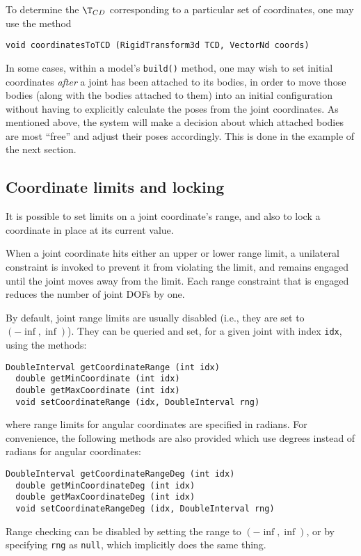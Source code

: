 To determine the $\T_{CD}$ corresponding to a particular set of
coordinates, one may use the method
\begin{lstlisting}[]
  void coordinatesToTCD (RigidTransform3d TCD, VectorNd coords)
\end{lstlisting}
%

In some cases, within a model's {\tt build()} method, one may wish to
set initial coordinates {\it after} a joint has been attached to its
bodies, in order to move those bodies (along with the bodies attached
to them) into an initial configuration without having to explicitly
calculate the poses from the joint coordinates. As mentioned
above, the system will make a decision about which attached bodies are
most ``free'' and adjust their poses accordingly. This is done in the
example of the next section.

\subsection{Coordinate limits and locking}
\label{coordinateLimitsAndLocking:sec}

It is possible to set limits on a joint coordinate's range, and also
to lock a coordinate in place at its current value.

When a joint coordinate hits either an upper or lower range limit, a
unilateral constraint is invoked to prevent it from violating the
limit, and remains engaged until the joint moves away from the
limit. Each range constraint that is engaged reduces the number of
joint DOFs by one.

By default, joint range limits are usually disabled (i.e., they are
set to $(-\inf, \inf)$). They can be queried and set, for a given
joint with index {\tt idx}, using the methods:
\begin{lstlisting}[]
  DoubleInterval getCoordinateRange (int idx)	
  double getMinCoordinate (int idx)
  double getMaxCoordinate (int idx)
  void setCoordinateRange (idx, DoubleInterval rng)
\end{lstlisting}
%
where range limits for angular coordinates are specified in
radians. For convenience, the following methods are also provided
which use degrees instead of radians for angular coordinates:
\begin{lstlisting}[]
  DoubleInterval getCoordinateRangeDeg (int idx)
  double getMinCoordinateDeg (int idx)
  double getMaxCoordinateDeg (int idx)
  void setCoordinateRangeDeg (idx, DoubleInterval rng)
\end{lstlisting}
%
Range checking can be disabled by setting the range to
$(-\inf, \inf)$, or by specifying {\tt rng} as {\tt null}, which
implicitly does the same thing.

